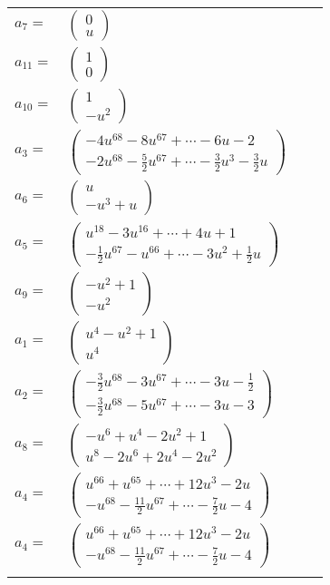 \documentclass[1p]{elsarticle_modified}
\theoremstyle{definition}
\begin{document}
\begin{tabular}{m{7pt} m{180pt} m{7pt} m{180pt} }
\flushright $a_{7}=$&$\begin{pmatrix}0\\u\end{pmatrix}$ \\
\flushright $a_{11}=$&$\begin{pmatrix}1\\0\end{pmatrix}$ \\
\flushright $a_{10}=$&$\begin{pmatrix}1\\- u^2\end{pmatrix}$ \\
\flushright $a_{3}=$&$\begin{pmatrix}-4 u^{68}-8 u^{67}+\cdots-6 u-2\\-2 u^{68}-\frac{5}{2} u^{67}+\cdots-\frac{3}{2} u^3-\frac{3}{2} u\end{pmatrix}$ \\
\flushright $a_{6}=$&$\begin{pmatrix}u\\- u^3+u\end{pmatrix}$ \\
\flushright $a_{5}=$&$\begin{pmatrix}u^{18}-3 u^{16}+\cdots+4 u+1\\-\frac{1}{2} u^{67}- u^{66}+\cdots-3 u^2+\frac{1}{2} u\end{pmatrix}$ \\
\flushright $a_{9}=$&$\begin{pmatrix}- u^2+1\\- u^2\end{pmatrix}$ \\
\flushright $a_{1}=$&$\begin{pmatrix}u^4- u^2+1\\u^4\end{pmatrix}$ \\
\flushright $a_{2}=$&$\begin{pmatrix}-\frac{3}{2} u^{68}-3 u^{67}+\cdots-3 u-\frac{1}{2}\\-\frac{3}{2} u^{68}-5 u^{67}+\cdots-3 u-3\end{pmatrix}$ \\
\flushright $a_{8}=$&$\begin{pmatrix}- u^6+u^4-2 u^2+1\\u^8-2 u^6+2 u^4-2 u^2\end{pmatrix}$ \\
\flushright $a_{4}=$&$\begin{pmatrix}u^{66}+u^{65}+\cdots+12 u^3-2 u\\- u^{68}-\frac{11}{2} u^{67}+\cdots-\frac{7}{2} u-4\end{pmatrix}$\\ \flushright $a_{4}=$&$\begin{pmatrix}u^{66}+u^{65}+\cdots+12 u^3-2 u\\- u^{68}-\frac{11}{2} u^{67}+\cdots-\frac{7}{2} u-4\end{pmatrix}$\\&\end{tabular}
\end{document}
